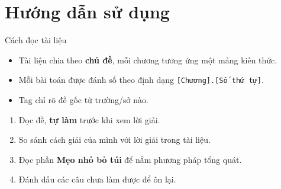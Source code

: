 \chapter*{Hướng dẫn sử dụng}

\begin{meobotui}{Cách đọc tài liệu}
  \begin{itemize}[leftmargin=2em, itemsep=4pt]
    \item Tài liệu chia theo \textbf{chủ đề}, mỗi chương tương ứng một mảng kiến thức.
    \item Mỗi bài toán được đánh số theo định dạng \texttt{[Chương].[Số thứ tự]}.
    \item Tag  chỉ rõ đề gốc từ trường/sở nào.
  \end{itemize}
\end{meobotui}

\vspace{10pt}

\begin{prompt}[title={Gợi ý cách học}]
  \begin{enumerate}[leftmargin=2em, itemsep=4pt]
    \item Đọc đề, \textbf{tự làm} trước khi xem lời giải.
    \item So sánh cách giải của mình với lời giải trong tài liệu.
    \item Đọc phần \textbf{Mẹo nhỏ bỏ túi} để nắm phương pháp tổng quát.
    \item Đánh dấu các câu chưa làm được để ôn lại.
  \end{enumerate}
\end{prompt}
